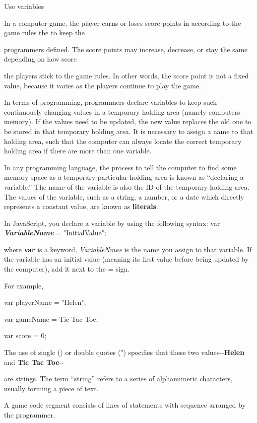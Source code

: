 \documentclass[
]{article}
\begin{document}
Use variables

In a computer game, the player earns or loses score points in according
to the game rules the to keep the

programmers defined. The score points may increase, decrease, or stay
the same depending on how score

the players stick to the game rules. In other words, the score point is
not a fixed value, because it varies as the players continue to play the
game.

In terms of programming, programmers declare variables to keep such
continuously changing values in a temporary holding area (namely
computer\textquotesingle s memory). If the values need to be updated,
the new value replaces the old one to be stored in that temporary
holding area. It is necessary to assign a name to that holding area,
such that the computer can always locate the correct temporary holding
area if there are more than one variable.

In any programming language, the process to tell the computer to find
some memory space as a temporary particular holding area is known as
``declaring a variable.'' The name of the variable is also the ID of the
temporary holding area. The values of the variable, such as a string, a
number, or a date which directly represents a constant value, are known
as \textbf{literals}.

In JavaScript, you declare a variable by using the following syntax: var
\emph{\textbf{VariableName}} = "InitialValue";

where \textbf{var} is a keyword, \emph{VariableNmae} is the name you
assign to that variable. If the variable has an initial value (meaning
its first value before being updated by the computer), add it next to
the = sign.

For example,

var playerName = "Helen";

var gameName = \textquotesingle Tic Tac Toe\textquotesingle;

var score = 0;

The use of single (\textquotesingle) or double quotes (") specifies that
these two values-\/-\textbf{Helen} and \textbf{Tic Tac Toe}-\/-

are strings. The term ``string'' refers to a series of alphanumeric
characters, usually forming a piece of text.

A game code segment consists of lines of statements with sequence
arranged by the programmer.
\end{document}
